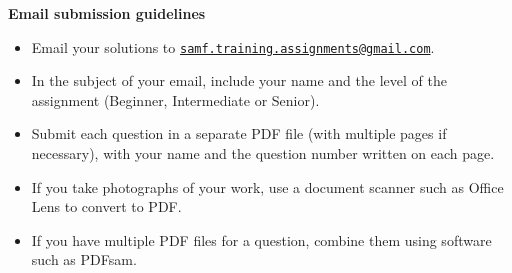 \documentclass{article}
\begin{document}
\vfill
\textbf{\Large Email submission guidelines}
\begin{itemize}
	\item Email your solutions to \href{mailto:samf.training.assignments@gmail.com}{\texttt{samf.training.assignments@gmail.com}}.
	\item In the subject of your email, include your name and the level of the assignment (Beginner, Intermediate or Senior).
	\item Submit each question in a separate PDF file (with multiple pages if necessary), with your name and the question number written on each page.
	\item If you take photographs of your work, use a document scanner such as Office Lens to convert to PDF.
	\item If you have multiple PDF files for a question, combine them using software such as PDFsam.
\end{itemize}
\end{document}
